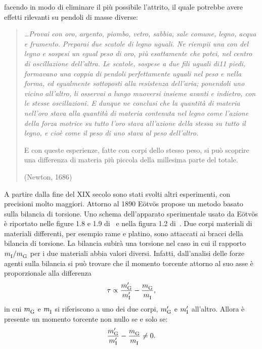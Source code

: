 facendo in modo di eliminare il più possibile l'attrito, il quale potrebbe avere
effetti rilevanti su pendoli di masse diverse:
\begin{quotation}
  {\itshape \dots Provai con oro, argento, piombo, vetro, sabbia, sale comune,
    legno, acqua e frumento. Preparai due scatole di legno uguali. Ne riempii
    una con del legno e sospesi un egual peso di oro, più esattamente che potei,
    nel centro di oscillazione dell'altra. Le scatole, sospese a due fili uguali
    di11 piedi, formavano una coppia di pendoli perfettamente uguali nel peso e
    nella forma, ed egualmente sottoposti alla resistenza dell'aria; ponendoli
    uno vicino all'altro, li osservai a lungo muoversi insieme avanti e
    indietro, con le stesse oscillazioni. E dunque ne conclusi che la quantità
    di materia nell'oro stava alla quantità di materia contenuta nel legno come
    l'azione della forza motrice su tutto l'oro stava all'azione della stessa su
    tutto il legno, e cioè come il peso di uno stava al peso dell'altro.

    E con queste esperienze, fatte con corpi dello stesso peso, si può scoprire
    una differenza di materia più piccola della millesima parte del totale.}
  (Newton, 1686)
\end{quotation}

A partire dalla fine del XIX secolo sono stati svolti altri esperimenti, con
precisioni molto maggiori.  Attorno al 1890 Eötvös propose un metodo basato
sulla bilancia di torsione.  Uno schema dell'apparato sperimentale usato da
Eötvös è riportato nelle figure 1.8 e 1.9
di~\textcite[27-28]{ohanian:gravitazione} e nella figura 1.2
di~\textcite[12]{weinberg:gravitation}.  Due corpi materiali di materiali
differenti, per esempio rame e platino, sono attaccati ai bracci della bilancia
di torsione.  La bilancia subirà una torsione nel caso in cui il rapporto
$m_{\textup{I}}^{}/m_{\textup{G}}^{}$
per i due materiali abbia valori diversi.  Infatti, dall'analisi delle forze
agenti sulla bilancia si può trovare che il momento torcente attorno al suo asse
è proporzionale alla differenza
\begin{equation}
  \tau \propto \frac{m'_{\textup{G}}}{m'_{\textup{I}}} -
  \frac{m_{\textup{G}}^{}}{m_{\textup{I}}^{}},
\end{equation}
in cui $m_{\textup{G}}^{}$
e $m_{\textup{I}}^{}$
si riferiscono a uno dei due corpi, $m'_{\textup{G}}$ e $m'_{\textup{I}}$
all'altro.  Allora è presente un momento torcente non nullo se e solo se:
\begin{equation}
  \frac{m'_{\textup{G}}}{m'_{\textup{I}}} -
  \frac{m_{\textup{G}}^{}}{m_{\textup{I}}^{}} \ne 0.
\end{equation}

